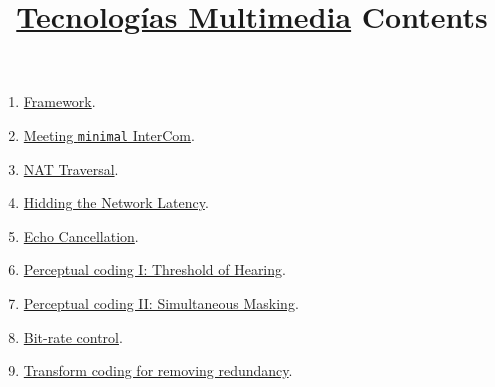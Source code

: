 
\title{\href{https://tecnologias-multimedia.github.io/}{Tecnologías Multimedia} \newline Contents}

\maketitle

\begin{enumerate}
\item \href{https://tecnologias-multimedia.github.io/contents/framework/}{Framework}. %
\item \href{https://tecnologias-multimedia.github.io/contents/minimal/}{Meeting \texttt{minimal} InterCom}. %
\item \href{https://tecnologias-multimedia.github.io/contents/NAT_traversal/}{NAT Traversal}. %
\item \href{https://tecnologias-multimedia.github.io/contents/latency/}{Hidding the Network Latency}. %
\item \href{https://tecnologias-multimedia.github.io/contents/echo_cancellation/}{Echo Cancellation}. %
\item \href{https://tecnologias-multimedia.github.io/contents/threshold_of_hearing/}{Perceptual coding I: Threshold of Hearing}.
\item \href{https://tecnologias-multimedia.github.io/contents/simultaneous_masking/}{Perceptual coding II: Simultaneous Masking}.
\item \href{https://tecnologias-multimedia.github.io/contents/BR_control/}{Bit-rate control}. %
\item \href{https://tecnologias-multimedia.github.io/contents/transform_coding/}{Transform coding for removing redundancy}. %
\end{enumerate}



